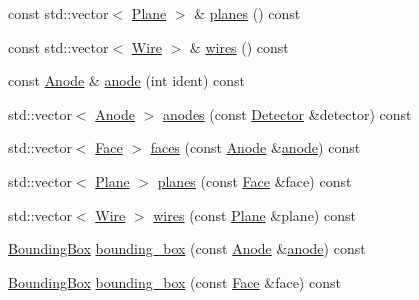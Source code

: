 \begin{DoxyCompactItemize}
\item 
const std\+::vector$<$ \hyperlink{struct_wire_cell_1_1_wire_schema_1_1_plane}{Plane} $>$ \& \hyperlink{class_wire_cell_1_1_wire_schema_1_1_store_aaedfc8ae05d2fe0ef02da6e9d8e8eca1}{planes} () const
\item 
const std\+::vector$<$ \hyperlink{struct_wire_cell_1_1_wire_schema_1_1_wire}{Wire} $>$ \& \hyperlink{class_wire_cell_1_1_wire_schema_1_1_store_acdd83e45f8004e2ad4ac625d7fce47d3}{wires} () const
\item 
const \hyperlink{struct_wire_cell_1_1_wire_schema_1_1_anode}{Anode} \& \hyperlink{class_wire_cell_1_1_wire_schema_1_1_store_a65a9d9af1b336097f853185cf58f3ea0}{anode} (int ident) const
\item 
std\+::vector$<$ \hyperlink{struct_wire_cell_1_1_wire_schema_1_1_anode}{Anode} $>$ \hyperlink{class_wire_cell_1_1_wire_schema_1_1_store_a26429e24e73daf38691e8f8aa940128e}{anodes} (const \hyperlink{struct_wire_cell_1_1_wire_schema_1_1_detector}{Detector} \&detector) const
\item 
std\+::vector$<$ \hyperlink{struct_wire_cell_1_1_wire_schema_1_1_face}{Face} $>$ \hyperlink{class_wire_cell_1_1_wire_schema_1_1_store_adbbe257301b3fb7d9c511569324c56f6}{faces} (const \hyperlink{struct_wire_cell_1_1_wire_schema_1_1_anode}{Anode} \&\hyperlink{class_wire_cell_1_1_wire_schema_1_1_store_a65a9d9af1b336097f853185cf58f3ea0}{anode}) const
\item 
std\+::vector$<$ \hyperlink{struct_wire_cell_1_1_wire_schema_1_1_plane}{Plane} $>$ \hyperlink{class_wire_cell_1_1_wire_schema_1_1_store_aefcc67db968fb4fe44e5cf610704f482}{planes} (const \hyperlink{struct_wire_cell_1_1_wire_schema_1_1_face}{Face} \&face) const
\item 
std\+::vector$<$ \hyperlink{struct_wire_cell_1_1_wire_schema_1_1_wire}{Wire} $>$ \hyperlink{class_wire_cell_1_1_wire_schema_1_1_store_a56cd36c90641895a9e3c22406c363061}{wires} (const \hyperlink{struct_wire_cell_1_1_wire_schema_1_1_plane}{Plane} \&plane) const
\item 
\hyperlink{class_wire_cell_1_1_bounding_box}{Bounding\+Box} \hyperlink{class_wire_cell_1_1_wire_schema_1_1_store_acfb80d41d1fe8264ea07c9d63a5202fe}{bounding\+\_\+box} (const \hyperlink{struct_wire_cell_1_1_wire_schema_1_1_anode}{Anode} \&\hyperlink{class_wire_cell_1_1_wire_schema_1_1_store_a65a9d9af1b336097f853185cf58f3ea0}{anode}) const
\item 
\hyperlink{class_wire_cell_1_1_bounding_box}{Bounding\+Box} \hyperlink{class_wire_cell_1_1_wire_schema_1_1_store_acf8cba891cf3ac52d76bcb4d3c59027d}{bounding\+\_\+box} (const \hyperlink{struct_wire_cell_1_1_wire_schema_1_1_face}{Face} \&face) const

\end{DoxyCompactItemize}
